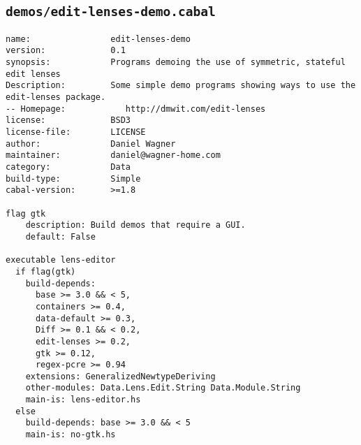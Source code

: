 \subsection{\texttt{demos/edit-lenses-demo.cabal}}
\begin{verbatim}
name:                edit-lenses-demo
version:             0.1
synopsis:            Programs demoing the use of symmetric, stateful edit lenses
Description:         Some simple demo programs showing ways to use the edit-lenses package.
-- Homepage:            http://dmwit.com/edit-lenses
license:             BSD3
license-file:        LICENSE
author:              Daniel Wagner
maintainer:          daniel@wagner-home.com
category:            Data
build-type:          Simple
cabal-version:       >=1.8

flag gtk
    description: Build demos that require a GUI.
    default: False

executable lens-editor
  if flag(gtk)
    build-depends:
      base >= 3.0 && < 5,
      containers >= 0.4,
      data-default >= 0.3,
      Diff >= 0.1 && < 0.2,
      edit-lenses >= 0.2,
      gtk >= 0.12,
      regex-pcre >= 0.94
    extensions: GeneralizedNewtypeDeriving
    other-modules: Data.Lens.Edit.String Data.Module.String
    main-is: lens-editor.hs
  else
    build-depends: base >= 3.0 && < 5
    main-is: no-gtk.hs

\end{verbatim}

